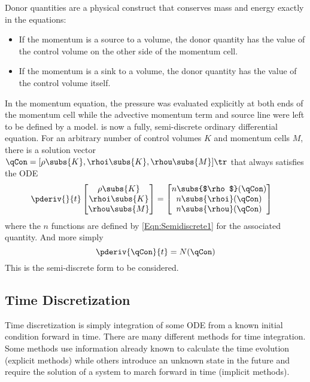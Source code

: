 Donor quantities are a physical construct that conserves mass and energy exactly in the equations:
\begin{itemize}
    \item{If the momentum is a source to a volume, the donor quantity has the value of the control volume on the other side of the momentum cell.}
    \item{If the momentum is a sink to a volume, the donor quantity has the value of the control volume itself.}
\end{itemize}
In the momentum equation, the pressure was evaluated explicitly at both ends of the momentum cell while the advective momentum term and source line were left to be defined by a model.
 is now a fully, semi-discrete ordinary differential equation.
For an arbitrary number of control volumes $K$ and momentum cells $M$, there is a solution vector $\qCon = [\rho\subs{K},\rhoi\subs{K},\rhou\subs{M}]\tr$ that always satisfies the ODE
\begin{align}
    \pderiv{}{t}
                \begin{bmatrix}
                    \rho\subs{K}    \\
                    \rhoi\subs{K}   \\
                    \rhou\subs{M}   \\
                \end{bmatrix}
                &=
                \begin{bmatrix}
                    n\subs{$\rho$} (\qCon) \\
                    n\subs{\rhoi}(\qCon) \\
                    n\subs{\rhou}(\qCon) 
                \end{bmatrix}
\end{align}
where the $n$ functions are defined by \cref{Eqn:Semidiscrete1} for the associated quantity.
And more simply
\begin{equation}
    \pderiv{\qCon}{t} =N(\qCon)
    \label{Eqn:SemidiscreteFinal}
\end{equation}
This is the semi-discrete form to be considered.


\subsection{Time Discretization}
Time discretization is simply integration of some ODE from a known initial condition forward in time.
There are many different methods for time integration.
Some methods use information already known to calculate the time evolution (explicit methods)
while others introduce an unknown state in the future and require the solution of a system to march forward in time (implicit methods).

